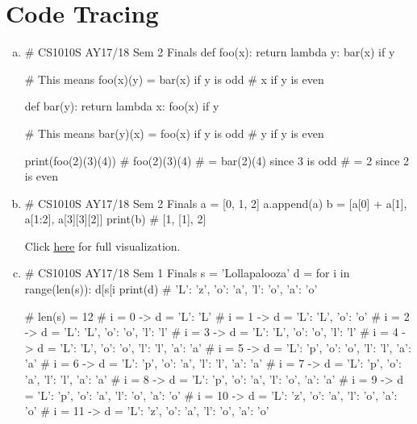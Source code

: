 \section{Code Tracing}
\begin{enumerate}[(a)]
\item
\begin{python}
# CS1010S AY17/18 Sem 2 Finals
def foo(x):
    return lambda y: bar(x) if y %

# This means foo(x)(y) = bar(x) if y is odd
#                        x if y is even

def bar(y):
    return lambda x: foo(x) if y %

# This means bar(y)(x) = foo(x) if y is odd
#                        y if y is even

print(foo(2)(3)(4))
# foo(2)(3)(4)
# = bar(2)(4) since 3 is odd
# = 2 since 2 is even
\end{python}


\item
\begin{python}
# CS1010S AY17/18 Sem 2 Finals
a = [0, 1, 2]
a.append(a)
b = [a[0] + a[1], a[1:2], a[3][3][2]]
print(b) # [1, [1], 2]
\end{python}
Click \href{https://pythontutor.com/visualize.html#code=a%20%3D%20%5B0,%201,%202%5D%0Aa.append%28a%29%0Ab%20%3D%20%5Ba%5B0%5D%20%2B%20a%5B1%5D,%20a%5B1%3A2%5D,%20a%5B3%5D%5B3%5D%5B2%5D%5D%0Aprint%28b%29&cumulative=false&curInstr=0&heapPrimitives=nevernest&mode=display&origin=opt-frontend.js&py=3&rawInputLstJSON=%5B%5D&textReferences=false}{\underline{here}} for full visualization.

\item
\begin{python}
# CS1010S AY17/18 Sem 1 Finals
s = 'Lollapalooza'
d = {}
for i in range(len(s)):
    d[s[i %
print(d) # {'L': 'z', 'o': 'a', 'l': 'o', 'a': 'o'}

# len(s) = 12
# i = 0 -> d = {'L': 'L'}
# i = 1 -> d = {'L': 'L', 'o': 'o'}
# i = 2 -> d = {'L': 'L', 'o': 'o', 'l': 'l'}
# i = 3 -> d = {'L': 'L', 'o': 'o', 'l': 'l'}
# i = 4 -> d = {'L': 'L', 'o': 'o', 'l': 'l', 'a': 'a'}
# i = 5 -> d = {'L': 'p', 'o': 'o', 'l': 'l', 'a': 'a'}
# i = 6 -> d = {'L': 'p', 'o': 'a', 'l': 'l', 'a': 'a'}
# i = 7 -> d = {'L': 'p', 'o': 'a', 'l': 'l', 'a': 'a'}
# i = 8 -> d = {'L': 'p', 'o': 'a', 'l': 'o', 'a': 'a'}
# i = 9 -> d = {'L': 'p', 'o': 'a', 'l': 'o', 'a': 'o'}
# i = 10 -> d = {'L': 'z', 'o': 'a', 'l': 'o', 'a': 'o'}
# i = 11 -> d = {'L': 'z', 'o': 'a', 'l': 'o', 'a': 'o'}
\end{python}


\end{enumerate}
